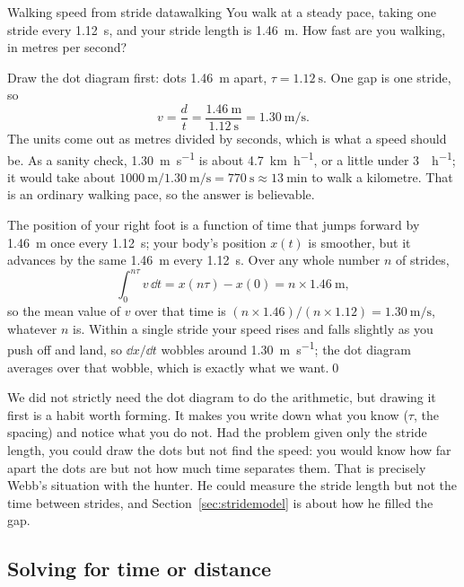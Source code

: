 \begin{example}{Walking speed from stride data}{walking}
You walk at a steady pace, taking one stride every \SI{1.12}{\second}, and your stride length is \SI{1.46}{\metre}. How fast are you walking, in metres per second?

\elem Draw the dot diagram first: dots \SI{1.46}{\metre} apart, $\tau = \SI{1.12}{\second}$. One gap is one stride, so
\[
v = \frac{d}{t} = \frac{\SI{1.46}{\metre}}{\SI{1.12}{\second}} = \SI{1.30}{\metre\per\second}.
\]
The units come out as metres divided by seconds, which is what a speed should be. As a sanity check, \SI{1.30}{\metre\per\second} is about \SI{4.7}{\kilo\metre\per\hour}, or a little under \SI{3}{\mile\per\hour}; it would take about $\SI{1000}{\metre}/\SI{1.30}{\metre\per\second} = \SI{770}{\second} \approx \SI{13}{\minute}$ to walk a kilometre. That is an ordinary walking pace, so the answer is believable.

\calc The position of your right foot is a function of time that jumps forward by \SI{1.46}{\metre} once every \SI{1.12}{\second}; your body's position $x(t)$ is smoother, but it advances by the same \SI{1.46}{\metre} every \SI{1.12}{\second}. Over any whole number $n$ of strides,
\[
\int_{0}^{n\tau} v\,\dd t = x(n\tau) - x(0) = n \times \SI{1.46}{\metre},
\]
so the mean value of $v$ over that time is $(n \times 1.46)/(n \times 1.12) = \SI{1.30}{\metre\per\second}$, whatever $n$ is. Within a single stride your speed rises and falls slightly as you push off and land, so $\dd x/\dd t$ wobbles around \SI{1.30}{\metre\per\second}; the dot diagram averages over that wobble, which is exactly what we want.\qed
\end{example}

We did not strictly need the dot diagram to do the arithmetic, but drawing it first is a habit worth forming. It makes you write down what you know ($\tau$, the spacing) and notice what you do not. Had the problem given only the stride length, you could draw the dots but not find the speed: you would know how far apart the dots are but not how much time separates them. That is precisely Webb's situation with the hunter. He could measure the stride length but not the time between strides, and Section~\ref{sec:stridemodel} is about how he filled the gap.

\subsection{Solving for time or distance}

